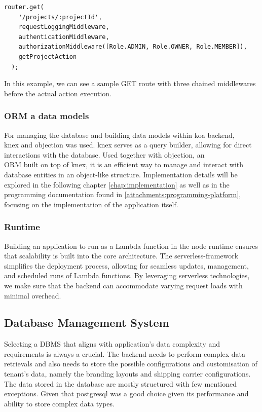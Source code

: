 \medskip
\begin{lstlisting}[caption=Koa router example]
  router.get(
    '/projects/:projectId',
    requestLoggingMiddleware,
    authenticationMiddleware,
    authorizationMiddleware([Role.ADMIN, Role.OWNER, Role.MEMBER]),
    getProjectAction
  );
\end{lstlisting}

In this example, we can see a sample GET route with three chained middlewares before the actual action execution.


\subsubsection{ORM a data models}
For managing the database and building data models within \gls{koa} backend,\\ \gls{knex} and \gls{objection} was used.
\gls{knex} serves as a query builder, allowing for direct interactions with the database.
Used together with \gls{objection}, an \\ \ac{ORM} built on top of \gls{knex}, it is an efficient way to manage and interact with database entities in an object-like structure.
Implementation details will be explored in the following chapter \ref{chap:implementation} as well as in the programming documentation found in \ref{attachments:programming-platform}, focusing on the implementation of the application itself.


\subsubsection{Runtime}
Building an application to run as a Lambda function in the \gls{node} runtime ensures that scalability is built into the core architecture.
The \gls{serverless-framework} simplifies the deployment process, allowing for seamless updates, management, and scheduled runs of Lambda functions.
By leveraging serverless technologies, we make sure that the backend can accommodate varying request loads with minimal overhead.


\subsection{Database Management System}
\label{subsec:dbms}
Selecting a \ac{DBMS} that aligns with application's data complexity and requirements is always a crucial. 
The backend needs to perform complex data retrievals and also needs to store the possible configurations and customisation of tenant's data, namely the branding layouts and shipping carrier configurations.
The data stored in the database are mostly structured with few mentioned exceptions.
Given that \gls{postgresql} was a good choice given its performance and ability to store complex data types.

